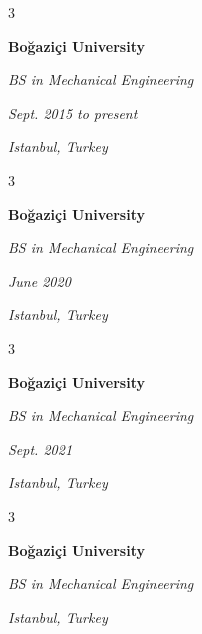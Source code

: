 \documentclass[10pt, letterpaper]{article}
\newenvironment{threecolentry}[3][]{
    \onecolentry
    \def\thirdColumn{#3}
    \setcolumnwidth{0.6 cm, \fill, 4.1 cm}
    \begin{paracol}{3}
    #2 \switchcolumn
}{
    \switchcolumn \raggedleft \thirdColumn
    \end{paracol}
    \endonecolentry
} %
\begin{document}
        \vspace{0.2 cm}

        \begin{threecolentry}{
            \vspace*{\fill}
            \textbullet
            \vspace*{3px}
            \vspace*{\fill}
        }{
        \textit{Sept. 2015 to present}
            
        \textit{Istanbul, Turkey}}
            \textbf{Boğaziçi University}

            \textit{BS in Mechanical Engineering}
        \end{threecolentry}



        \vspace{0.2 cm}

        \begin{threecolentry}{
            \vspace*{\fill}
            \textbullet
            \vspace*{3px}
            \vspace*{\fill}
        }{
        \textit{June 2020}
            
        \textit{Istanbul, Turkey}}
            \textbf{Boğaziçi University}

            \textit{BS in Mechanical Engineering}
        \end{threecolentry}



        \vspace{0.2 cm}

        \begin{threecolentry}{
            \vspace*{\fill}
            \textbullet
            \vspace*{3px}
            \vspace*{\fill}
        }{
        \textit{Sept. 2021}
            
        \textit{Istanbul, Turkey}}
            \textbf{Boğaziçi University}

            \textit{BS in Mechanical Engineering}
        \end{threecolentry}



        \vspace{0.2 cm}

        \begin{threecolentry}{
            \vspace*{\fill}
            \textbullet
            \vspace*{3px}
            \vspace*{\fill}
        }{

            
        \textit{Istanbul, Turkey}}
            \textbf{Boğaziçi University}

            \textit{BS in Mechanical Engineering}
        \end{threecolentry}
\end{document}
